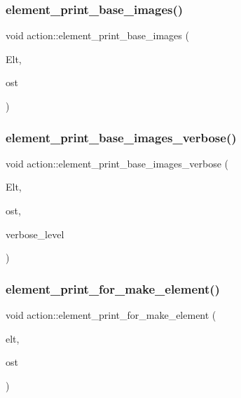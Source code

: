 \subsubsection{\texorpdfstring{element\+\_\+print\+\_\+base\+\_\+images()}{element\_print\_base\_images()}\hspace{0.1cm}{\footnotesize\ttfamily [2/2]}}
{\footnotesize\ttfamily void action\+::element\+\_\+print\+\_\+base\+\_\+images (\begin{DoxyParamCaption}\item[{\mbox{\hyperlink{galois_8h_a09fddde158a3a20bd2dcadb609de11dc}{I\+NT}} $\ast$}]{Elt,  }\item[{ostream \&}]{ost }\end{DoxyParamCaption})}

\mbox{\label{classaction_a75a205a349711d606c041fcdf5efb849}} 
\subsubsection{\texorpdfstring{element\+\_\+print\+\_\+base\+\_\+images\+\_\+verbose()}{element\_print\_base\_images\_verbose()}}
{\footnotesize\ttfamily void action\+::element\+\_\+print\+\_\+base\+\_\+images\+\_\+verbose (\begin{DoxyParamCaption}\item[{\mbox{\hyperlink{galois_8h_a09fddde158a3a20bd2dcadb609de11dc}{I\+NT}} $\ast$}]{Elt,  }\item[{ostream \&}]{ost,  }\item[{\mbox{\hyperlink{galois_8h_a09fddde158a3a20bd2dcadb609de11dc}{I\+NT}}}]{verbose\+\_\+level }\end{DoxyParamCaption})}

\mbox{\label{classaction_afd16c6446777c0ce519c84be26815c49}} 
\subsubsection{\texorpdfstring{element\+\_\+print\+\_\+for\+\_\+make\+\_\+element()}{element\_print\_for\_make\_element()}}
{\footnotesize\ttfamily void action\+::element\+\_\+print\+\_\+for\+\_\+make\+\_\+element (\begin{DoxyParamCaption}\item[{void $\ast$}]{elt,  }\item[{ostream \&}]{ost }\end{DoxyParamCaption})}

